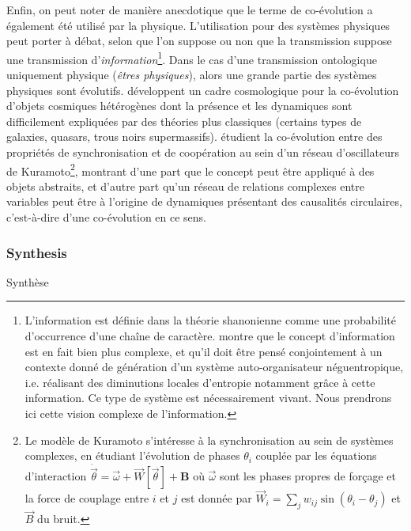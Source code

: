 {Enfin, on peut noter de manière anecdotique que le terme de co-évolution a également été utilisé par la physique. L'utilisation pour des systèmes physiques peut porter à débat, selon que l'on suppose ou non que la transmission suppose une transmission d'\emph{information}\footnote{L'information est définie dans la théorie shanonienne comme une probabilité d'occurrence d'une chaîne de caractère. \cite{morin1976methode} montre que le concept d'information est en fait bien plus complexe, et qu'il doit être pensé conjointement à un contexte donné de génération d'un système auto-organisateur néguentropique, i.e. réalisant des diminutions locales d'entropie notamment grâce à cette information. Ce type de système est nécessairement vivant. Nous prendrons ici cette vision complexe de l'information.}. Dans le cas d'une transmission ontologique uniquement physique (\emph{êtres physiques}), alors une grande partie des systèmes physiques sont évolutifs. \cite{hopkins2008cosmological} développent un cadre cosmologique pour la co-évolution d'objets cosmiques hétérogènes dont la présence et les dynamiques sont difficilement expliquées par des théories plus classiques (certains types de galaxies, quasars, trous noirs supermassifs). \cite{antonioni2017coevolution} étudient la co-évolution entre des propriétés de synchronisation et de coopération au sein d'un réseau d'oscillateurs de Kuramoto\footnote{Le modèle de Kuramoto s'intéresse à la synchronisation au sein de systèmes complexes, en étudiant l'évolution de phases $\theta_i$ couplée par les équations d'interaction $\dot{\vec{\theta}} = \vec{\omega} + \vec{W}\left[\vec{\theta}\right] + \mathbf{B}$ où $\vec{\omega}$ sont les phases propres de forçage et la force de couplage entre $i$ et $j$ est donnée par $\vec{W}_{i} = \sum_j w_{ij} \sin\left(\theta_i - \theta_j\right)$ et $\vec{B}$ du bruit.}, montrant d'une part que le concept peut être appliqué à des objets abstraits, et d'autre part qu'un réseau de relations complexes entre variables peut être à l'origine de dynamiques présentant des causalités circulaires, c'est-à-dire d'une co-évolution en ce sens.
}

\subsubsection{Synthesis}{Synthèse}


